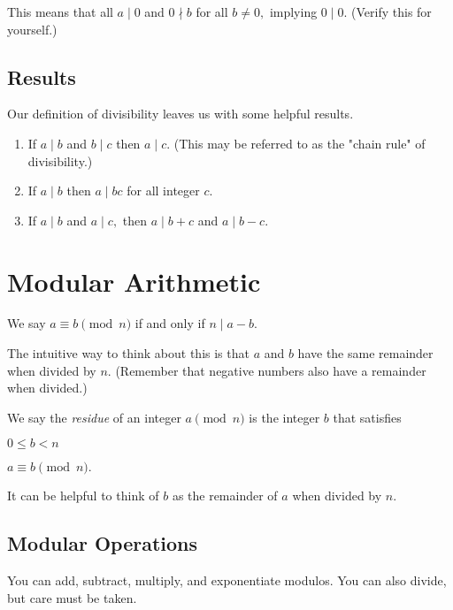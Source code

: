 \documentclass[blue,onecol]{shooting}
\begin{document}
This means that all $a\mid 0$ and $0\nmid b$ for all $b\neq 0,$ implying $0\mid 0.$ (Verify this for yourself.)
\subsection{Results}
Our definition of divisibility leaves us with some helpful results.
\begin{fact}
\hfill
\begin{enumerate}
    \item If $a\mid b$ and $b\mid c$ then $a\mid c.$ (This may be referred to as the "chain rule" of divisibility.)
    
    \item If $a\mid b$ then $a\mid bc$ for all integer $c.$
    
    \item If $a\mid b$ and $a\mid c,$ then $a\mid b+c$ and $a\mid b-c.$
\end{enumerate}
\end{fact}

\section{Modular Arithmetic}
\begin{defi}
We say $a\equiv b\pmod {n}$ if and only if $n\mid a-b.$
\end{defi}

The intuitive way to think about this is that $a$ and $b$ have the same remainder when divided by $n.$ (Remember that negative numbers also have a remainder when divided.)

\begin{defi}
We say the \textit{residue} of an integer $a\pmod{n}$ is the integer $b$ that satisfies
\begin{itemize}
    \Item $0\leq b<n$
    
    \Item $a\equiv b\pmod{n}.$
\end{itemize}
\end{defi}

It can be helpful to think of $b$ as the remainder of $a$ when divided by $n.$

\subsection{Modular Operations}
You can add, subtract, multiply, and exponentiate modulos. You can also divide, but care must be taken.
\end{document}
